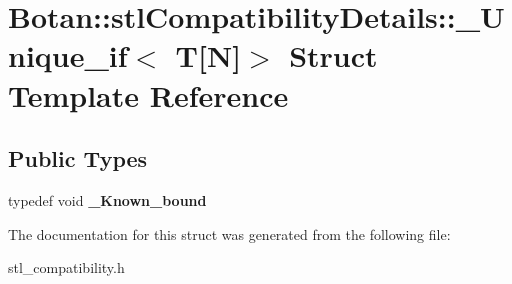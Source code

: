 \hypertarget{struct_botan_1_1stl_compatibility_details_1_1___unique__if_3_01_t[_n]_4}{}\section{Botan\+:\+:stl\+Compatibility\+Details\+:\+:\+\_\+\+Unique\+\_\+if$<$ T\mbox{[}N\mbox{]}$>$ Struct Template Reference}
\label{struct_botan_1_1stl_compatibility_details_1_1___unique__if_3_01_t[_n]_4}
\subsection*{Public Types}
\begin{DoxyCompactItemize}
\item 
\mbox{\label{struct_botan_1_1stl_compatibility_details_1_1___unique__if_3_01_t[_n]_4_a24df754773cb0d733d92ebe0adccf40f}} 
typedef void {\bfseries \+\_\+\+Known\+\_\+bound}
\end{DoxyCompactItemize}


The documentation for this struct was generated from the following file\+:\begin{DoxyCompactItemize}
\item 
stl\+\_\+compatibility.\+h\end{DoxyCompactItemize}

